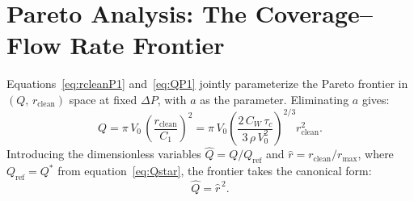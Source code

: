 \documentclass[aps,prfluids,reprint,amsmath,amssymb,floatfix]{revtex4-2}
\begin{document}
\section{Pareto Analysis: The Coverage--Flow Rate Frontier}
\label{sec:pareto}

Equations~\eqref{eq:rcleanP1} and~\eqref{eq:QP1} jointly parameterize
the Pareto frontier in $(Q,\,r_\mathrm{clean})$ space at fixed $\Delta P$,
with $a$ as the parameter. Eliminating $a$ gives:
\begin{equation}
  Q = \pi\,V_0\,\left(\frac{r_\mathrm{clean}}{C_1}\right)^2
  = \pi\,V_0 \left(\frac{2\,C_W\,\tau_c}{3\,\rho\,V_0^2}\right)^{2/3}
  r_\mathrm{clean}^2.
  \label{eq:paretoraw}
\end{equation}
Introducing the dimensionless variables $\hat{Q} = Q/Q_\mathrm{ref}$ and
$\hat{r} = r_\mathrm{clean}/r_\mathrm{max}$, where
$Q_\mathrm{ref} = Q^*$ from equation~\eqref{eq:Qstar}, the frontier
takes the canonical form:
\begin{equation}
  \hat{Q} = \hat{r}^{\,2}.
  \label{eq:pareto}
\end{equation}
\end{document}
